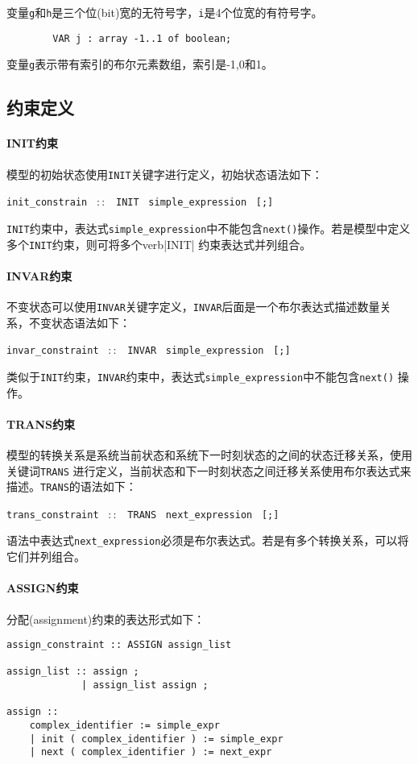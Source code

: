 变量\verb|g|和\verb|h|是三个位(bit)宽的无符号字，\verb|i|是4个位宽的有符号字。

\begin{lstlisting}
        VAR j : array -1..1 of boolean;
\end{lstlisting}

变量\verb|g|表示带有索引的布尔元素数组，索引是-1,0和1。

\subsection{约束定义}
\paragraph{INIT约束}
模型的初始状态使用\verb|INIT|关键字进行定义，初始状态语法如下：

\verb|init_constrain| \ $::$ \ \verb|INIT| \ \verb|simple_expression| \ \verb|[;]|

\verb|INIT|约束中，表达式\verb|simple_expression|中不能包含\verb|next()|操作。若是模型中定义多个\verb|INIT|约束，则可将多个verb|INIT| 约束表达式并列组合。

\paragraph{INVAR约束}
不变状态可以使用\verb|INVAR|关键字定义，\verb|INVAR|后面是一个布尔表达式描述数量关系，不变状态语法如下：

\verb|invar_constraint| \ $::$ \ \verb|INVAR| \ \verb|simple_expression| \ \verb|[;]|

类似于\verb|INIT|约束，\verb|INVAR|约束中，表达式\verb|simple_expression|中不能包含\verb|next()| 操作。

\paragraph{TRANS约束}
模型的转换关系是系统当前状态和系统下一时刻状态的之间的状态迁移关系，使用关键词\verb|TRANS| 进行定义，当前状态和下一时刻状态之间迁移关系使用布尔表达式来描述。\verb|TRANS|的语法如下：

\verb|trans_constraint| \ $::$ \ \verb|TRANS| \ \verb|next_expression| \ \verb|[;]|

语法中表达式\verb|next_expression|必须是布尔表达式。若是有多个转换关系，可以将它们并列组合。

\paragraph{ASSIGN约束}
分配(assignment)约束的表达形式如下：
\begin{lstlisting}
assign_constraint :: ASSIGN assign_list

assign_list :: assign ;
             | assign_list assign ;

assign ::
    complex_identifier := simple_expr
    | init ( complex_identifier ) := simple_expr
    | next ( complex_identifier ) := next_expr
\end{lstlisting}

